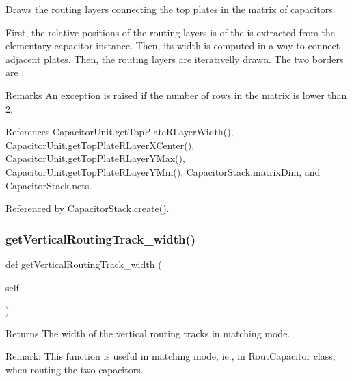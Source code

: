 Draws the routing layers connecting the top plates in the matrix of capacitors. 

First, the relative positions of the routing layers is of the is extracted from the elementary capacitor instance. Then, its width is computed in a way to connect adjacent plates. Then, the routing layers are iterativelly drawn. The two borders are . \begin{DoxyRemark}{Remarks}
An exception is raised if the number of rows in the matrix is lower than 2. 
\end{DoxyRemark}


References Capacitor\+Unit.\+get\+Top\+Plate\+R\+Layer\+Width(), Capacitor\+Unit.\+get\+Top\+Plate\+R\+Layer\+X\+Center(), Capacitor\+Unit.\+get\+Top\+Plate\+R\+Layer\+Y\+Max(), Capacitor\+Unit.\+get\+Top\+Plate\+R\+Layer\+Y\+Min(), Capacitor\+Stack.\+matrix\+Dim, and Capacitor\+Stack.\+nets.



Referenced by Capacitor\+Stack.\+create().

\mbox{\label{classpython_1_1capacitormatrix_1_1CapacitorStack_a306f64ae38c4f512855ec9b276f47232}} 
\subsubsection{\texorpdfstring{get\+Vertical\+Routing\+Track\+\_\+width()}{getVerticalRoutingTrack\_width()}}
{\footnotesize\ttfamily def get\+Vertical\+Routing\+Track\+\_\+width (\begin{DoxyParamCaption}\item[{}]{self }\end{DoxyParamCaption})}

\begin{DoxyReturn}{Returns}
The width of the vertical routing tracks in matching mode. 
\end{DoxyReturn}
\begin{DoxyParagraph}{Remark\+: This function is useful in matching mode, ie., in  Rout\+Capacitor class, when routing the two capacitors. }

\end{DoxyParagraph}
\mbox{\label{classpython_1_1capacitormatrix_1_1CapacitorStack_a7c13ac996df61c10e7249efa4b26a39d}} 
